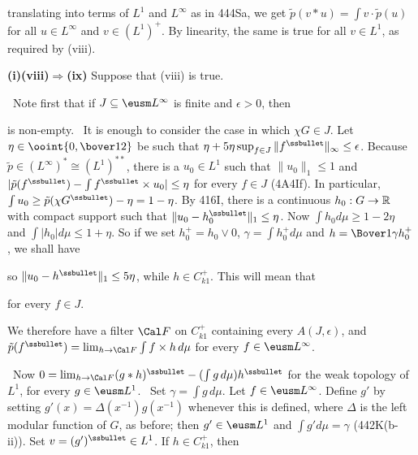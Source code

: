 {\noindent translating into terms of $L^1$ and $L^{\infty}$ as in 444Sa,
we get $\tilde p(v*u)=\int v\cdot\tilde p(u)$ for all
$u\in L^{\infty}$ and $v\in(L^1)^+$.   By linearity, the same is
true for all $v\in L^1$, as required by (viii).


{\bf (i)(viii)$\Rightarrow$(ix)} Suppose that (viii) is true.

\medskip

\quad\grheada\ Note first that if
$J\subseteq\eusm L^{\infty}$ is finite and $\epsilon>0$, then


\noindent is non-empty.   \Prf\ It is enough to consider the case in which
$\chi G\in J$.   Let $\eta\in\ooint{0,\bover12}$ be such
that $\eta+5\eta\sup_{f\in J}\|f^{\ssbullet}\|_{\infty}\le\epsilon$.
Because
$\tilde p\in(L^{\infty})^*\cong(L^1)^{**}$, there is a $u_0\in L^1$ such
that $\|u_0\|_1\le 1$ and
$|\tilde p(f^{\ssbullet})-\int f^{\ssbullet}\times u_0|\le\eta$ for
every $f\in J$ (4A4If).   In particular,
$\int u_0\ge\tilde p(\chi G^{\ssbullet})-\eta=1-\eta$.   By 416I, there is
a continuous $h_0:G\to\Bbb R$ with compact support such that
$\|u_0-h_0^{\ssbullet}\|_1\le\eta$.   Now $\int h_0d\mu\ge 1-2\eta$
and $\int|h_0|d\mu\le 1+\eta$.   So if we set $h_0^+=h_0\vee 0$,
$\gamma=\int h_0^+d\mu$ and $h=\Bover1{\gamma}h_0^+$, we shall have


\noindent so
$\|u_0-h^{\ssbullet}\|_1\le 5\eta$, while $h\in C_{k1}^+$.   This will mean
that


\noindent for every $f\in J$.\ \QeD\

We therefore have a filter $\Cal F$ on $C_{k1}^+$
containing every $A(J,\epsilon)$, and
$\tilde p(f^{\ssbullet})=\lim_{h\to\Cal F}\int f\times h\,d\mu$ for
every $f\in\eusm L^{\infty}$.

\medskip

\quad\grheadb\ Now
$0=\lim_{h\to\Cal F}(g*h)^{\ssbullet}-(\int g\,d\mu)h^{\ssbullet}$ for
the weak topology of $L^1$, for every $g\in\eusm L^1$.   \Prf\ Set
$\gamma=\int g\,d\mu$.   Let $f\in\eusm L^{\infty}$.   Define $g'$ by
setting $g'(x)=\Delta(x^{-1})g(x^{-1})$ whenever this is defined,
where $\Delta$ is the left modular function of $G$, as before;
then $g'\in\eusm L^1$
and $\int g'd\mu=\gamma$ (442K(b-ii)).
Set $v=(g')^{\ssbullet}\in L^1$.   If $h\in C_{k1}^+$, then

}
